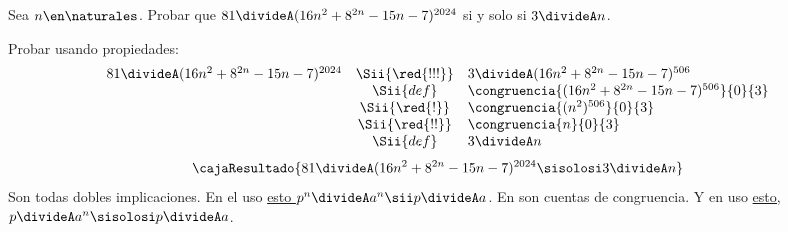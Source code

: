 \begin{enunciado}{\ejExtra}
  Sea $n \en \naturales$. Probar que
  $
    81 \divideA (16 n^2 + 8^{2n} - 15n - 7)^{2024}
  $ si y solo si
  $3 \divideA n$.
\end{enunciado}
Probar usando propiedades:
$$
  \begin{array}{rcl}
    81 \divideA (16 n^2 + 8^{2n} - 15n - 7)^{2024}
     & \Sii{\red{!!!}} &
    3 \divideA (16 n^2 + 8^{2n} - 15n - 7)^{506}          \\
     & \Sii{def}       &
    \congruencia{(16 n^2 + 8^{2n} - 15n - 7)^{506}}{0}{3} \\
     & \Sii{\red{!}}   &
    \congruencia{(n^2)^{506}}{0}{3}                       \\
     & \Sii{\red{!!}}  &
    \congruencia{n}{0}{3}                                 \\
     & \Sii{def}       &
    3 \divideA n
  \end{array}
$$
$$
  \cajaResultado{
    81 \divideA (16 n^2 + 8^{2n} - 15n - 7)^{2024}
    \sisolosi
    3 \divideA n
  }
$$
Son todas dobles implicaciones.
En el \red{!!!} uso \hyperlink{teoria4:exponentes}{esto $p^n \divideA a^n \sii p \divideA a$}.
En \red{!} son cuentas de congruencia.
Y en \red{!!} uso \hyperlink{teoria4:priProductos}{esto, $p \divideA a^n \sisolosi p \divideA a$}.

\begin{aportes}
  \item {}
\end{aportes}

